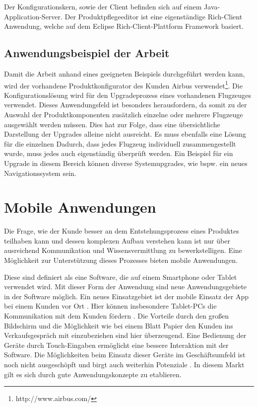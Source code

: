 Der Konfigurationskern, sowie der Client befinden sich auf einem Java-Application-Server. Der Produktpflegeeditor ist eine eigenständige Rich-Client Anwendung, welche auf dem Eclipse Rich-Client-Plattform Framework\cite{bib:eclipseRCP} basiert.

\subsection{Anwendungsbeispiel der Arbeit} \label{airbusConfigurator}
Damit die Arbeit anhand eines geeigneten Beispiels durchgeführt werden kann, wird der vorhandene Produktkonfigurator des Kunden Airbus verwendet\footnote{http://www.airbus.com/}.
Die Konfigurationslösung wird für den Upgradeprozess eines vorhandenen Flugzeuges verwendet.
Dieses Anwendungsfeld ist besonders herausfordern, da somit zu der Auswahl der Produktkomponenten zusätzlich einzelne oder mehrere Flugzeuge ausgewählt werden müssen. Dies hat zur Folge, dass eine übersichtliche Darstellung der Upgrades alleine nicht ausreicht. Es muss ebenfalls eine Lösung für die einzelnen  Dadurch, dass jedes Flugzeug individuell zusammengestellt wurde, muss jedes auch eigenständig überprüft werden. 
Ein Beispiel für ein Upgrade in diesem Bereich können diverse Systemupgrades, wie bspw. ein neues Navigationssystem sein. 
\par



  
\section{Mobile Anwendungen}
Die Frage, wie der Kunde besser an dem Entstehungsprozess eines Produktes teilhaben kann und dessen komplexen Aufbau verstehen kann ist nur über ausreichend Kommunikation und Wissensvermittlung zu bewerkstelligen. Eine Möglichkeit zur Unterstützung dieses Prozesses bieten mobile Anwendungen.\par

Diese sind definiert als eine Software, die auf einem Smartphone oder Tablet verwendet wird. Mit dieser Form der Anwendung sind neue Anwendungsgebiete in der Software möglich. Ein neues Einsatzgebiet ist der mobile Einsatz der App bei einem Kunden vor Ort \cite{bib:mobileMarketing}. Hier können insbesondere Tablet-PCs die Kommunikation mit dem Kunden fördern \cite{bib:tableVertrieb}. Die Vorteile durch den großen Bildschirm und die Möglichkeit wie bei einem Blatt Papier den Kunden ins Verkaufsgespräch mit einzubeziehen sind hier überzeugend. Eine Bedienung der Geräte durch Touch-Eingaben ermöglicht eine bessere Interaktion mit der Software. Die Möglichkeiten beim Einsatz dieser Geräte im Geschäftsumfeld ist noch nicht ausgeschöpft und birgt auch weiterhin Potenziale \cite[Fazit]{bib:mobileMarketing2}. In diesem Markt gilt es sich durch gute Anwendungskonzepte zu etablieren. \par


